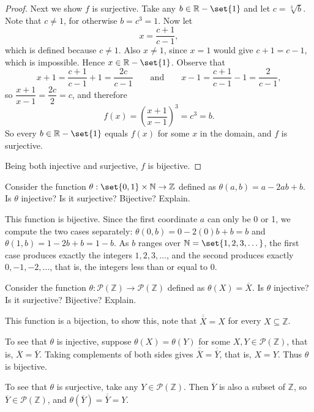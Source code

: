 \documentclass[DIN, pagenumber=false, fontsize=11pt, parskip=half]{scrartcl}
\begin{document}
\begin{problems}
\begin{proof}
        Next we show $f$ is surjective. Take any $b \in \mathbb{R} - \set{1}$ and let $c = \sqrt[3]{b}$. Note that $c \neq 1$, for otherwise $b = c^3 = 1$. Now let
        \[
            x = \dfrac{c+1}{c-1},
        \]
        which is defined because $c \neq 1$. Also $x \neq 1$, since $x = 1$ would give $c+1 = c-1$, which is impossible. Hence $x \in \mathbb{R} - \set{1}$. Observe that
        \[
            x + 1 = \dfrac{c+1}{c-1} + 1 = \dfrac{2c}{c-1}
            \qquad \text{and} \qquad
            x - 1 = \dfrac{c+1}{c-1} - 1 = \dfrac{2}{c-1},
        \]
        so $\dfrac{x+1}{x-1} = \dfrac{2c}{2} = c$, and therefore
        \[
            f(x) = \left(\dfrac{x+1}{x-1}\right)^3 = c^3 = b.
        \]
        So every $b \in \mathbb{R} - \set{1}$ equals $f(x)$ for some $x$ in the domain, and $f$ is surjective.

        Being both injective and surjective, $f$ is bijective.
    \end{proof}

    \problem Consider the function $\theta : \set{0,1} \times \mathbb{N} \to \mathbb{Z}$ defined as $\theta(a,b) = a - 2ab + b$. Is $\theta$ injective? Is it surjective? Bijective? Explain.

    \answer This function is bijective. Since the first coordinate $a$ can only be 0 or 1, we compute the two cases separately:
    $\theta(0,b) = 0 - 2(0)b + b = b$ and $\theta(1,b) = 1 - 2b + b = 1 - b$.
    As $b$ ranges over $\mathbb{N} = \set{1,2,3,\dots}$, the first case produces exactly the integers $1,2,3,\dots$, and the second produces exactly $0,-1,-2,\dots$, that is, the integers less than or equal to 0.

    \problem Consider the function $\theta : \mathcal{P}(\mathbb{Z}) \to \mathcal{P}(\mathbb{Z})$ defined as $\theta(X) = \overline{X}$. Is $\theta$ injective? Is it surjective? Bijective? Explain.

    \answer This function is a bijection, to show this, note that $\overline{\overline{X}} = X$ for every $X \subseteq \mathbb{Z}$.

    To see that $\theta$ is injective, suppose $\theta(X) = \theta(Y)$ for some $X,Y \in \mathcal{P}(\mathbb{Z})$, that is, $\overline{X} = \overline{Y}$. Taking complements of both sides gives $\overline{\overline{X}} = \overline{\overline{Y}}$, that is, $X = Y$. Thus $\theta$ is bijective.

    To see that $\theta$ is surjective, take any $Y \in \mathcal{P}(\mathbb{Z})$. 
    Then $\overline{Y}$ is also a subset of $\mathbb{Z}$, so $\overline{Y} \in \mathcal{P}(\mathbb{Z})$, and $\theta(\overline{Y}) = \overline{\overline{Y}} = Y$.


\end{problems}
\end{document}
